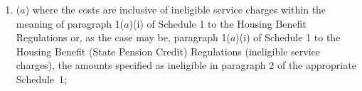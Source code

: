 \documentclass[12pt,a4paper]{article}
\begin{document}
\begin{enumerate}\item[]

%
%

($a$) where the costs are inclusive of ineligible service charges within the meaning of paragraph 1($a$)(i) of Schedule 1 to the Housing Benefit Regulations or, as the case may be, paragraph 1($a$)(i) of Schedule 1 to the Housing Benefit (State Pension Credit) Regulations (ineligible service charges), the amounts specified as ineligible in paragraph 2 of the appropriate Schedule~1;


\end{enumerate}
\end{document}

